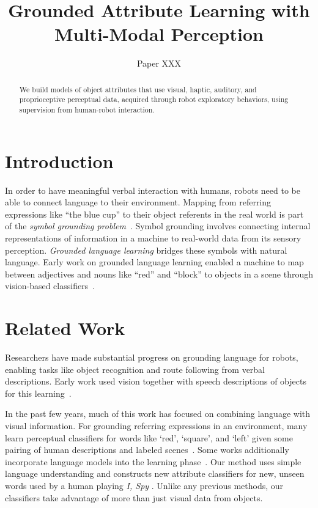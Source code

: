 \documentclass{article}
\title{Grounded Attribute Learning with Multi-Modal Perception}
\author{Paper XXX}
\newcommand{\ispy}{\textit{I, Spy} }
\begin{document}
\maketitle

\begin{abstract}
	We build models of object attributes that use visual, haptic, auditory, and proprioceptive perceptual data, acquired through robot exploratory behaviors, using supervision from human-robot interaction.
\end{abstract}

\section{Introduction}

	In order to have meaningful verbal interaction with humans, robots need to be able to connect language to their environment. Mapping from referring expressions like ``the blue cup'' to their object referents in the real world is part of the \textit{symbol grounding problem}~\cite{harnad:phys90}. Symbol grounding involves connecting internal representations of information in a machine to real-world data from its sensory perception. \textit{Grounded language learning} bridges these symbols with natural language. Early work on grounded language learning enabled a machine to map between adjectives and nouns like ``red'' and ``block'' to objects in a scene through vision-based classifiers~\cite{roy:evocomm01}.

\section{Related Work}

	Researchers have made substantial progress on grounding language for robots, enabling tasks like object recognition and route following from verbal descriptions. Early work used vision together with speech descriptions of objects for this learning~\cite{roy:cogsci02}.

	In the past few years, much of this work has focused on combining language with visual information. For grounding referring expressions in an environment, many learn perceptual classifiers for words like `red', `square', and `left' given some pairing of human descriptions and labeled scenes~\cite{liu:acl14,malinowski:nips14,mohan:acs13,sun:icra13,dindo:iros10}. Some works additionally incorporate language models into the learning phase~\cite{spranger:ijcai15,krishnamurthy:acl13,perera:aaai13,matuszek:icml12}. Our method uses simple language understanding and constructs new attribute classifiers for new, unseen words used by a human playing \ispy. Unlike any previous methods, our classifiers take advantage of more than just visual data from objects.
\end{document}
